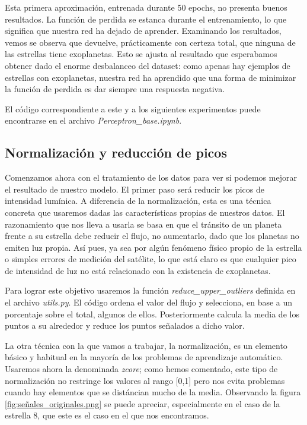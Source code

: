 Esta primera aproximación, entrenada durante 50 epochs, no presenta buenos resultados. La función de perdida se estanca durante el entrenamiento, lo que significa que nuestra red ha dejado de aprender. Examinando los resultados, vemos se observa que devuelve, prácticamente con certeza total, que ninguna de las estrellas tiene exoplanetas. Esto se ajusta al resultado que esperabamos obtener dado el enorme desbalanceo del dataset: como apenas hay ejemplos de estrellas con exoplanetas, nuestra red ha aprendido que una forma de minimizar la función de perdida es dar siempre una respuesta negativa.


El código correspondiente a este y a los siguientes experimentos puede encontrarse en el archivo \textit{Perceptron\_base.ipynb}.

\subsection{Normalización y reducción de picos}

Comenzamos ahora con el tratamiento de los datos para ver si podemos mejorar el resultado de nuestro modelo. El primer paso será reducir los picos de intensidad lumínica. A diferencia de la normalización, esta es una técnica concreta que usaremos dadas las características propias de nuestros datos. El razonamiento que nos lleva a usarla se basa en que el tránsito de un planeta frente a su estrella debe reducir el flujo, no aumentarlo, dado que los planetas no emiten luz propia. Así pues, ya sea por algún fenómeno físico propio de la estrella o simples errores de medición del satélite, lo que está claro es que cualquier pico de intensidad de luz no está relacionado con la existencia de exoplanetas.

Para lograr este objetivo usaremos la función \textit{reduce\_upper\_outliers} definida en el archivo \textit{utils.py}. El código ordena el valor del flujo y selecciona, en base a un porcentaje sobre el total, algunos de ellos. Posteriormente calcula la media de los puntos a su alrededor y reduce los puntos señalados a dicho valor.

La otra técnica con la que vamos a trabajar, la normalización, es un elemento básico y habitual en la mayoría de los problemas de aprendizaje automático. Usaremos ahora la denominada \textit{zcore}; como hemos comentado, este tipo de normalización no restringe los valores al rango [0,1] pero nos evita problemas cuando hay elementos que se distáncian mucho de la media. Observando la figura \ref{fig:señales_originales.png}  se puede apreciar, especialmente en el caso de la estrella 8, que este es el caso en el que nos encontramos.

